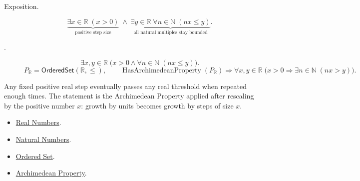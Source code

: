 \begin{remark*}
\begin{description}
  \item[Exposition.]
\[
\underbrace{\exists x\in\mathbb{R}\;(x>0)}_{\text{positive step size}}
\;\land\;
\underbrace{\exists y\in\mathbb{R}\;\forall n\in\mathbb{N}\;(nx\le y)}_{\text{all natural multiples stay bounded}}.
\]


  \item[.]
  \[
\exists x,y\in\mathbb{R}\;\bigl(x>0\land \forall n\in\mathbb{N}\;(nx\le y)\bigr).
\]
\[
P_{\mathbb{R}}=\mathsf{OrderedSet}(\mathbb{R},\leq),\qquad
\operatorname{HasArchimedeanProperty}(P_{\mathbb{R}})
\Longrightarrow
\forall x,y\in\mathbb{R}\;\bigl(x>0\Longrightarrow \exists n\in\mathbb{N}\;(nx>y)\bigr).
\]
\end{description}
\end{remark*}

\begin{remark*}[Interpretation]
Any fixed positive real step eventually passes any real threshold when repeated enough times. The statement is the Archimedean Property applied after rescaling by the positive number $x$: growth by units becomes growth by steps of size $x$.
\end{remark*}

\begin{dependencies}
\begin{itemize}
\item \hyperref[def:reals]{Real Numbers}.
\item \hyperref[def:natural-numbers]{Natural Numbers}.
\item \hyperref[def:ordered-set]{Ordered Set}.
\item \hyperref[thm:archimedean-property]{Archimedean Property}.
\end{itemize}
\end{dependencies}







